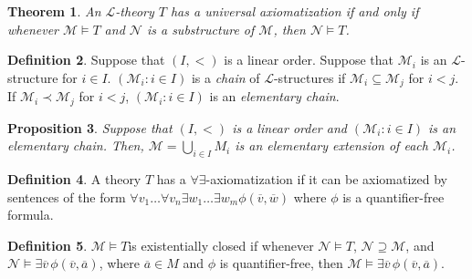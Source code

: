 \documentclass{amsart}
\newtheorem{theorem}{Theorem}[subsection]
\newtheorem{proposition}[theorem]{Proposition}
\theoremstyle{definition}
\newtheorem{definition}[theorem]{Definition}
\numberwithin{equation}{section}
\begin{document}
\begin{theorem}
    An $\mathcal{L}$-theory $T$ has a universal axiomatization if and only if
    whenever $\mathcal{M} \models T$ and $\mathcal{N}$ is a substructure of $\mathcal{M}$,
    then $\mathcal{N} \models T$.
\end{theorem}

\begin{definition}
    Suppose that $(I,<)$ is a linear order.
    Suppose that $\mathcal{M}_i$ is an $\mathcal{L}$-structure for $i \in I$.
    $(\mathcal{M}_i: i \in I)$ is a \emph{chain} of $\mathcal{L}$-structures if $\mathcal{M}_i \subseteq \mathcal{M}_j$ for $i < j$.
    If $\mathcal{M}_i \prec \mathcal{M}_j$ for $i < j$,
    $(\mathcal{M}_i: i \in I)$ is an \emph{elementary chain}.
\end{definition}

\begin{proposition}
    Suppose that $(I,<)$ is a linear order and
    $(\mathcal{M}_i: i \in I)$ is an elementary chain.
    Then, $\mathcal{M} = \bigcup_{i\in I} M_i$ is an elementary extension of each $\mathcal{M}_i$.
\end{proposition}

\begin{definition}
    A theory $T$ has a $\forall\exists$-axiomatization if it can be axiomatized by sentences of
    the form $\forall v_1\dots\forall v_n \exists w_1\dots \exists w_m \phi(\overline{v},\overline{w})$
    where $\phi$ is a quantifier-free formula.
\end{definition}

\begin{definition}
    $\mathcal{M} \models T$is existentially closed
    if whenever $\mathcal{N} \models T$, $\mathcal{N} \supseteq \mathcal{M}$,
    and $\mathcal{N} \models \exists \overline{v}\, \phi(\overline{v},\overline{a})$,
    where $\overline{a} \in M$ and $\phi$ is quantifier-free,
    then $\mathcal{M} \models \exists \overline{v} \, \phi(\overline{v},\overline{a})$.
\end{definition}
\end{document}
